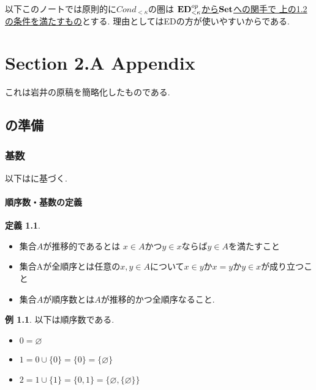 \documentclass[dvipdfmx,a4paper,11pt]{report}
\theoremstyle{definition}
\newtheorem{dfn}[thm]{定義}
\newtheorem{exa}[thm]{例}
\begin{document}
以下このノートでは原則的に$Cond_{<\kappa}$の圏は
\underline{${\bf ED}_{< \kappa}^{op}$から${\bf Set}$への関手で 
上の1.2の条件を満たすもの}とする. 理由としてはEDの方が使いやすいからである.


\chapter{Section 2.A Appendix}
これは岩井の原稿を簡略化したものである. 

\section{\cite[Proposition 2.9]{Sch19}の準備}

\subsection{基数}
以下は\cite{Tana}に基づく.

\subsubsection{順序数・基数の定義}
 
 \begin{tcolorbox}
 [colback = white, colframe = green!35!black, fonttitle = \bfseries,breakable = true]
\begin{dfn}\cite[3.3節]{Tana}
\begin{itemize}
\item 集合$A$が推移的であるとは
$x \in A$かつ$y \in x$ならば$y \in A$を満たすこと
\item 集合Aが全順序とは任意の$x,y \in A$について$x \in y$か$x=y$か$y \in x$が成り立つこと
\item 集合$A$が順序数とは$A$が推移的かつ全順序なること. 
\end{itemize}
\end{dfn}
\end{tcolorbox}


\begin{exa}
以下は順序数である. 
\begin{itemize}
\item $0 = \varnothing$
\item $1 = 0 \cup \{ 0\} = \{ 0\} =\{ \varnothing\}$
\item $2 = 1 \cup \{1\} = \{0,1 \}= \{\varnothing, \{ \varnothing\}\}$
\end{itemize}
\end{exa}
\end{document}
